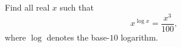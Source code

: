 Find all real $x$ such that
\[
x^{\log x}=\dfrac{x^3}{100},
\]
where $\log$ denotes the base-$10$ logarithm.
